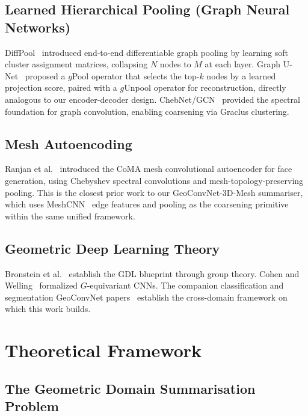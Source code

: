 \documentclass[10pt,conference]{IEEEtran}
\begin{document}
\subsection{Learned Hierarchical Pooling (Graph Neural Networks)}

DiffPool~\cite{ying2018hierarchical} introduced end-to-end differentiable
graph pooling by learning soft cluster assignment matrices, collapsing $N$
nodes to $M$ at each layer.  Graph U-Net~\cite{gao2019graph} proposed a
$g$Pool operator that selects the top-$k$ nodes by a learned projection
score, paired with a $g$Unpool operator for reconstruction, directly
analogous to our encoder-decoder design.
ChebNet/GCN~\cite{defferrard2016convolutional} provided the spectral
foundation for graph convolution, enabling coarsening via Graclus
clustering.

\subsection{Mesh Autoencoding}

Ranjan et al.~\cite{ranjan2018generating} introduced the CoMA mesh
convolutional autoencoder for face generation, using Chebyshev spectral
convolutions and mesh-topology-preserving pooling.  This is the closest
prior work to our GeoConvNet-3D-Mesh summariser, which uses
MeshCNN~\cite{hanocka2019meshcnn} edge features and pooling as the
coarsening primitive within the same unified framework.

\subsection{Geometric Deep Learning Theory}

Bronstein et al.~\cite{bronstein2021geometric} establish the GDL blueprint
through group theory.  Cohen and Welling~\cite{cohen2016group} formalized
$G$-equivariant CNNs.  The companion classification and segmentation
GeoConvNet papers~\cite{geoconvnet_cls,geoconvnet_seg} establish the
cross-domain framework on which this work builds.

\section{Theoretical Framework}
\label{sec:theory}

\subsection{The Geometric Domain Summarisation Problem}
\end{document}
